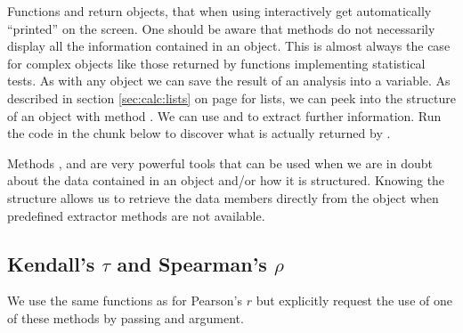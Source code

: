 \documentclass[krantz2]{krantz}\usepackage{knitr}
\begin{document}
\begin{playground}
Functions  and  return \Rlang objects, that when using \Rlang interactively get automatically ``printed'' on the screen. One should be aware that  methods do not necessarily display all the information contained in an \Rlang object. This is almost always the case for complex objects like those returned by \Rlang functions implementing statistical tests. As with any \Rlang object we can save the result of an analysis into a variable. As described in section \ref{sec:calc:lists} on page \pageref{sec:calc:lists} for lists, we can peek into the structure of an object with method . We can use  and  to extract further information. Run the code in the chunk below to discover what is actually returned by .

\begin{knitrout}\footnotesize
{}\color{fgcolor}\begin{kframe}
\begin{alltt}
 \hlkwb{<-} 
\end{alltt}
\end{kframe}
\end{knitrout}

Methods ,  and  are very powerful tools that can be used when we are in doubt about the data contained in an object and/or how it is structured. Knowing the structure allows us to retrieve the data members directly from the object when predefined extractor methods are not available.
\end{playground}

\subsection{Kendall's $\tau$ and Spearman's $\rho$}

We use the same functions as for Pearson's $r$ but explicitly request the use of one of these methods by passing and argument.
\end{document}
